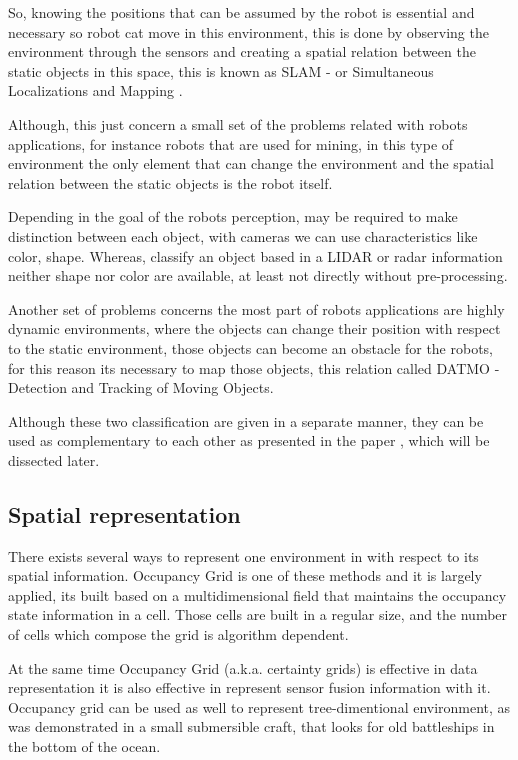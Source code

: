 So, knowing the positions that can be assumed by the robot is essential and necessary so robot cat move in this environment, this is done by observing the environment through the sensors and creating a spatial relation between the static objects in this space, this is known as SLAM - or Simultaneous Localizations and Mapping \cite{iyengar1991autonomous}.

Although, this just concern a small set of the problems related with robots applications, for instance robots that are used for mining, in this type of environment the only element that can change the environment and the spatial relation between the static objects is the robot itself. 

Depending in the goal of the robots perception, may be required to make distinction between each object, with cameras we can use characteristics like color, shape. Whereas, classify an object based in a LIDAR or radar information neither shape nor color are available, at least not directly without pre-processing.

Another set of problems concerns the most part of robots applications are highly dynamic environments, where the objects can change their position with respect to the static environment, those objects can become an obstacle for the robots, for this reason its necessary to map those objects, this relation called DATMO - Detection and Tracking of Moving Objects.

Although these two classification are given in a separate manner, they can be used as complementary to each other as presented in the paper \cite{Wang04a}, which will be dissected later.

\subsection{Spatial representation}

There exists several ways to represent one environment in with respect to its spatial information. Occupancy Grid is one of these methods and it is largely applied, its built based on a multidimensional field that maintains the occupancy state information in a cell\cite{Elfes:1989:UOG:68491.68495}. Those cells are built in a regular size, and the number of cells which compose the grid is algorithm dependent.

At the same time Occupancy Grid (a.k.a. certainty grids) is effective in data representation it is also effective in represent sensor fusion information with it. Occupancy grid can be used as well to represent tree-dimentional environment, as was demonstrated in a small submersible craft, that looks for old battleships in the bottom of the ocean\cite{DBLP:journals/aim/Moravec88}.

